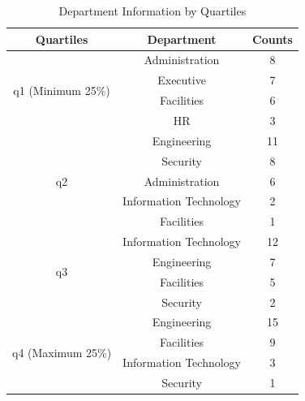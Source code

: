 \documentclass[aps, 10pt, a4paper]{article}
\begin{document}
                \begin{table}[htbp]
                    \centering
                    \caption{Department Information by Quartiles}
                    \label{tb:movequantile}
                    \begin{tabular}{c|cc}
                        Quartiles & Department & Counts \\ \hline
                        \multirow{4}{*}{q1 (Minimum 25\%)} & Administration & 8 \\
                        & Executive & 7 \\
                        & Facilities & 6 \\
                        & HR & 3 \\ \hline
                        \multirow{5}{*}{q2} & Engineering & 11 \\
                        & Security & 8 \\
                        & Administration & 6 \\
                        & Information Technology & 2 \\
                        & Facilities & 1 \\ \hline
                        \multirow{4}{*}{q3} & Information Technology & 12 \\
                        & Engineering & 7 \\
                        & Facilities & 5 \\
                        & Security & 2 \\ \hline
                        \multirow{4}{*}{q4 (Maximum 25\%)} & Engineering & 15 \\
                        & Facilities & 9 \\
                        & Information Technology & 3 \\
                        & Security & 1 \\
                    \end{tabular}
                \end{table}
                
\end{document}

